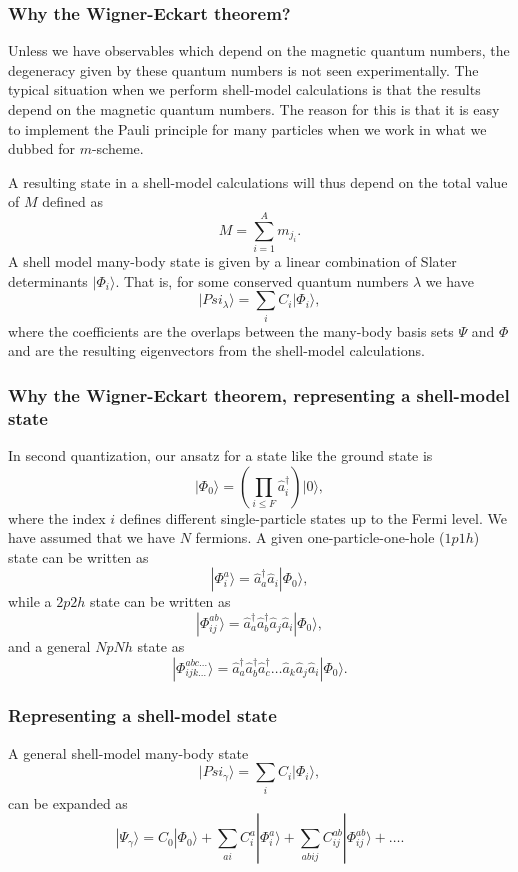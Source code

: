 \documentclass{beamer}
\begin{document}
\begin{frame}
\frametitle{Why the Wigner-Eckart theorem?}

\begin{block}{}
Unless we have observables which depend on the magnetic quantum numbers, the degeneracy 
given by these quantum numbers is not seen experimentally. 
The typical situation when we perform shell-model calculations is that the results depend on the magnetic quantum numbers. The reason for this is that it is easy to implement the Pauli principle for many particles when we work in what we dubbed for $m$-scheme.

A resulting state in a shell-model calculations will thus depend on the total value of $M$ defined as 
\[
M=\sum_{i=1}^{A}m_{j_i}.
\]
A shell model many-body state is given by a linear combination of Slater determinants $\vert \Phi_i\rangle$. That is, for some conserved quantum numbers $\lambda$  we have
\[
\vert Psi_{\lambda}\rangle = \sum_{i} C_i \vert \Phi_i\rangle,
\]
where the coefficients are the overlaps between the many-body basis sets $\Psi$ and $\Phi$ and are the resulting eigenvectors from the shell-model calculations.
\end{block}
\end{frame}

\begin{frame}
\frametitle{Why the Wigner-Eckart theorem, representing a shell-model state}

\begin{block}{}
In second quantization, our ansatz for a state like the ground state is
\[
\vert \Phi_0\rangle = \left(\prod_{i\le F}\hat{a}_{i}^{\dagger}\right)|0\rangle,
\]
where the index $i$ defines different single-particle states up to the Fermi level. We have assumed that we have $N$ fermions.
A given one-particle-one-hole ($1p1h$) state can be written as
\[
|\Phi_i^a\rangle = \hat{a}_{a}^{\dagger}\hat{a}_i|\Phi_0\rangle,
\]
while a $2p2h$ state can be written as
\[
|\Phi_{ij}^{ab}\rangle = \hat{a}_{a}^{\dagger}\hat{a}_{b}^{\dagger}\hat{a}_j\hat{a}_i|\Phi_0\rangle,
\]
and a general $NpNh$ state as
\[
|\Phi_{ijk\dots}^{abc\dots}\rangle = \hat{a}_{a}^{\dagger}\hat{a}_{b}^{\dagger}\hat{a}_{c}^{\dagger}\dots\hat{a}_k\hat{a}_j\hat{a}_i|\Phi_0\rangle.
\]
\end{block}
\end{frame}

\begin{frame}
\frametitle{Representing a shell-model state}

\begin{block}{}
A general shell-model many-body state 
\[
\vert Psi_{\gamma}\rangle = \sum_{i} C_i \vert \Phi_i\rangle,
\]
can be expanded as 
\[
|\Psi_{\gamma}\rangle=C_0|\Phi_0\rangle+\sum_{ai}C_i^a|\Phi_i^a\rangle+\sum_{abij}C_{ij}^{ab}|\Phi_{ij}^{ab}\rangle+\dots. 
\]
\end{block}
\end{frame}
\end{document}
